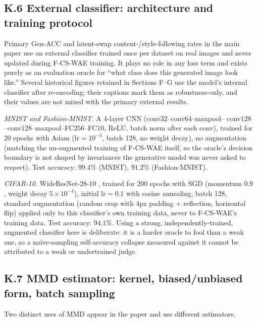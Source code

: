 \documentclass[letterpaper]{article} %
\newcommand{\ours}{F-CS-WAE}
\begin{document}
\subsection{K.6 External classifier: architecture and training protocol}

Primary Gen-ACC and latent-swap content-/style-following rates in the main
paper use an external classifier trained once per dataset on real images and
never updated during \ours{} training. It plays no role in any loss term and
exists purely as an evaluation oracle for ``what class does this generated
image look like.'' Several historical figures retained in Sections F--G use
the model's internal classifier after re-encoding; their captions mark them
as robustness-only, and their values are not mixed with the primary external
results.

\emph{MNIST and Fashion-MNIST.} A 4-layer CNN (conv$32$--conv$64$--maxpool--
conv$128$--conv$128$--maxpool--FC$256$--FC$10$, ReLU, batch norm after each
conv), trained for 20 epochs with Adam ($\mathrm{lr}=10^{-3}$, batch 128, no
weight decay), no augmentation (matching the un-augmented training of
\ours{} itself, so the oracle's decision boundary is not shaped by
invariances the generative model was never asked to respect). Test accuracy:
$99.4\%$ (MNIST), $91.2\%$ (Fashion-MNIST).

\emph{CIFAR-10.} WideResNet-28-10 \citep{zagoruyko2016wide}, trained for 200
epochs with SGD (momentum $0.9$, weight decay $5\times10^{-4}$), initial
$\mathrm{lr}=0.1$ with cosine annealing, batch 128, standard augmentation
(random crop with 4px padding + reflection, horizontal flip) applied only to
this classifier's own training data, never to \ours{}'s training data. Test
accuracy: $94.1\%$. Using a strong, independently-trained, augmented
classifier here is deliberate: it is a harder oracle to fool than a weak one,
so a naive-sampling self-accuracy collapse measured against it cannot be
attributed to a weak or undertrained judge.

\subsection{K.7 MMD estimator: kernel, biased/unbiased form, batch sampling}

Two distinct uses of MMD appear in the paper and use different estimators.
\end{document}
